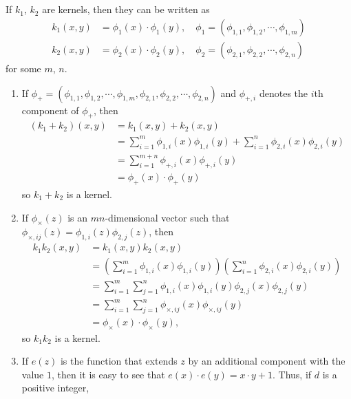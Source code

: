 \documentclass[a4paper,12pt]{article}
\theoremstyle{remark}
\begin{document}
\subsection{}
If $k_1$, $k_2$ are kernels, then they can be written as
\begin{align*}
    k_1(x, y) &= \phi_1(x) \cdot \phi_1(y), \quad \phi_1 = (\phi_{1, 1}, \phi_{1, 2}, \cdots, \phi_{1, m}) \\
    k_2(x, y) &= \phi_2(x) \cdot \phi_2(y), \quad \phi_2 = (\phi_{2, 1}, \phi_{2, 2}, \cdots, \phi_{2, n})
\end{align*}
for some $m$, $n$.
\begin{enumerate}[label=(\alph*)]
    \item
        If $\phi_+ = (\phi_{1, 1}, \phi_{1, 2}, \cdots, \phi_{1, m}, \phi_{2, 1}, \phi_{2, 2}, \cdots, \phi_{2, n})$ and $\phi_{+, i}$ denotes the $i$th component of $\phi_+$, then
        \begin{align*}
            (k_1 + k_2)(x, y) &= k_1(x, y) + k_2(x, y) \\
            &= \sum_{i = 1}^m \phi_{1, i}(x) \phi_{1, i}(y) + \sum_{i = 1}^n \phi_{2, i}(x) \phi_{2, i}(y) \\
            &= \sum_{i = 1}^{m + n} \phi_{+, i}(x) \phi_{+, i}(y) \\
            &= \phi_+(x) \cdot \phi_+(y)
        \end{align*}
        so $k_1 + k_2$ is a kernel.
    \item
        If $\phi_\times(z)$ is an $mn$-dimensional vector such that $\phi_{\times, ij}(z) = \phi_{1, i}(z) \phi_{2, j}(z)$, then
        \begin{align*}
            k_1 k_2(x, y) &= k_1(x, y) k_2(x, y) \\
            &= \left( \sum_{i = 1}^m \phi_{1, i}(x) \phi_{1, i}(y) \right) \left( \sum_{i = 1}^n \phi_{2, i}(x) \phi_{2, i}(y) \right) \\
            &= \sum_{i = 1}^m \sum_{j = 1}^n \phi_{1, i}(x) \phi_{1, i}(y) \phi_{2, j}(x) \phi_{2, j}(y) \\
            &= \sum_{i = 1}^{m} \sum_{j = 1}^n \phi_{\times, ij}(x) \phi_{\times, ij}(y) \\
            &= \phi_\times(x) \cdot \phi_\times(y),
        \end{align*}
        so $k_1 k_2$ is a kernel.
    \item
        If $e(z)$ is the function that extends $z$ by an additional component with the value $1$, then it is easy to see that $e(x) \cdot e(y) = x \cdot y + 1$. Thus, if $d$ is a positive integer,

\end{enumerate}
\end{document}
